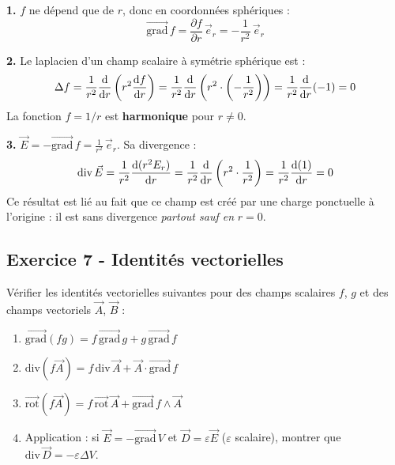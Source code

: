 \documentclass[12pt,a4paper]{article}
\begin{document}
\begin{boitecorrige}
\textbf{1.} $f$ ne dépend que de $r$, donc en coordonnées sphériques :
\[
\overrightarrow{\text{grad}}\,f = \frac{\partial f}{\partial r}\,\vec{e}_r = -\frac{1}{r^2}\,\vec{e}_r
\]

\textbf{2.} Le laplacien d'un champ scalaire à symétrie sphérique est :
\[
\Delta f = \frac{1}{r^2}\frac{\mathrm{d}}{\mathrm{d} r}\left(r^2\frac{\mathrm{d} f}{\mathrm{d} r}\right) = \frac{1}{r^2}\frac{\mathrm{d}}{\mathrm{d} r}\left(r^2\cdot\left(-\frac{1}{r^2}\right)\right) = \frac{1}{r^2}\frac{\mathrm{d}}{\mathrm{d} r}(-1) = 0
\]
La fonction $f = 1/r$ est \textbf{harmonique} pour $r\neq0$.

\textbf{3.} $\vec{E} = -\overrightarrow{\text{grad}}\,f = \frac{1}{r^2}\,\vec{e}_r$. Sa divergence :
\[
\text{div}\,\vec{E} = \frac{1}{r^2}\frac{\mathrm{d}(r^2 E_r)}{\mathrm{d} r} = \frac{1}{r^2}\frac{\mathrm{d}}{\mathrm{d} r}\left(r^2\cdot\frac{1}{r^2}\right) = \frac{1}{r^2}\frac{\mathrm{d}(1)}{\mathrm{d} r} = 0
\]
Ce résultat est lié au fait que ce champ est créé par une charge ponctuelle à l'origine : il est sans divergence \textit{partout sauf en} $r=0$.
\end{boitecorrige}

\subsection*{Exercice 7 - Identités vectorielles \niveau{\moyen}}

\begin{boiteexercice}
Vérifier les identités vectorielles suivantes pour des champs scalaires $f$, $g$ et des champs vectoriels $\vec{A}$, $\vec{B}$ :
\begin{enumerate}[label=(\alph*)]
  \item $\overrightarrow{\text{grad}}(fg) = f\,\overrightarrow{\text{grad}}\,g + g\,\overrightarrow{\text{grad}}\,f$
  \item $\text{div}(f\vec{A}) = f\,\text{div}\,\vec{A} + \vec{A}\cdot\overrightarrow{\text{grad}}\,f$
  \item $\overrightarrow{\text{rot}}(f\vec{A}) = f\,\overrightarrow{\text{rot}}\,\vec{A} + \overrightarrow{\text{grad}}\,f \wedge \vec{A}$
  \item Application : si $\vec{E} = -\overrightarrow{\text{grad}}\,V$ et $\vec{D} = \varepsilon\vec{E}$ ($\varepsilon$ scalaire), montrer que $\text{div}\,\vec{D} = -\varepsilon\Delta V$.
\end{enumerate}
\end{boiteexercice}
\end{document}

